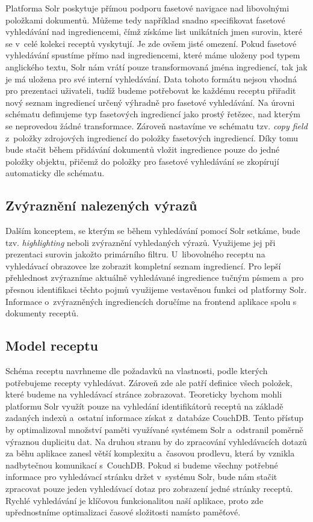 Platforma Solr poskytuje přímou podporu fasetové navigace nad libovolnými položkami dokumentů. Můžeme tedy například snadno specifikovat fasetové vyhledávání nad ingrediencemi, čímž získáme list unikátních jmen surovin, které se v~celé kolekci receptů vyskytují. Je zde ovšem jisté omezení. Pokud fasetové vyhledávání spustíme přímo nad ingrediencemi, které máme uloženy pod typem anglického textu, Solr nám vrátí pouze transformovaná jména ingrediencí, tak jak je má uložena pro své interní vyhledávání. Data tohoto formátu nejsou vhodná pro prezentaci uživateli, tudíž budeme potřebovat ke každému receptu přiřadit nový seznam ingrediencí určený výhradně pro fasetové vyhledávání. Na úrovni schématu definujeme typ fasetových ingrediencí jako prostý řetězec, nad kterým se neprovedou žádné transformace. Zároveň nastavíme ve schématu tzv. \emph{copy field} z~položky zdrojových ingrediencí do položky fasetových ingrediencí. Díky tomu bude stačit během přidávání dokumentů vložit ingredience pouze do jedné položky objektu, přičemž do položky pro fasetové vyhledávání se zkopírují automaticky dle schématu.

\subsection{Zvýraznění nalezených výrazů}

Dalším konceptem, se kterým se během vyhledávání pomocí Solr setkáme, bude tzv. \emph{highlighting} neboli zvýraznění vyhledaných výrazů. Využijeme jej při prezentaci surovin jakožto primárního filtru. U~libovolného receptu na vyhledávací obrazovce lze zobrazit kompletní seznam ingrediencí. Pro lepší přehlednost zvýrazníme aktuálně vyhledávané ingredience tučným písmem a~pro přesnou identifikaci těchto pojmů využijeme vestavěnou funkci od platformy Solr. Informace o~zvýrazněných ingrediencích doručíme na frontend aplikace spolu s dokumenty receptů.

\subsection{Model receptu}

Schéma receptu navrhneme dle požadavků na vlastnosti, podle kterých potřebujeme recepty vyhledávat. Zároveň zde ale patří definice všech položek, které budeme na vyhledávací stránce zobrazovat. Teoreticky bychom mohli platformu Solr využít pouze na vyhledání identifikátorů receptů na základě zadaných indexů a~ostatní informace získat z~databáze CouchDB. Tento přístup by optimalizoval množství paměti využívané systémem Solr a~odstranil poměrně výraznou duplicitu dat. Na druhou stranu by do zpracování vyhledávacích dotazů za běhu aplikace zanesl větší komplexitu a~časovou prodlevu, která by vznikla nadbytečnou komunikací s~CouchDB. Pokud si budeme všechny potřebné informace pro vyhledávací stránku držet v~systému Solr, bude nám stačit zpracovat pouze jeden vyhledávací dotaz pro zobrazení jedné stránky receptů. Rychlé vyhledávání je klíčovou funkcionalitou naší aplikace, proto zde upřednostníme optimalizaci časové složitosti namísto paměťové.

